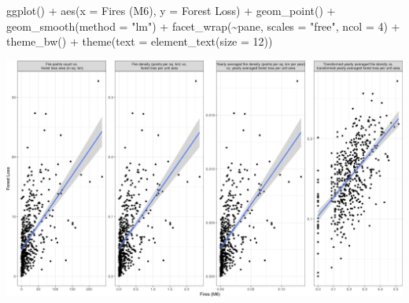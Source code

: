 \documentclass[10pt,landscape,a3paper]{article}
\newenvironment{Shaded}{\begin{snugshade}}{\end{snugshade}}
\newcommand{\AttributeTok}[1]{\textcolor[rgb]{0.77,0.63,0.00}{#1}}
\newcommand{\DecValTok}[1]{\textcolor[rgb]{0.00,0.00,0.81}{#1}}
\newcommand{\FunctionTok}[1]{\textcolor[rgb]{0.00,0.00,0.00}{#1}}
\newcommand{\NormalTok}[1]{#1}
\newcommand{\SpecialCharTok}[1]{\textcolor[rgb]{0.00,0.00,0.00}{#1}}
\newcommand{\StringTok}[1]{\textcolor[rgb]{0.31,0.60,0.02}{#1}}
\begin{document}
\begin{Shaded}
\begin{Highlighting}[]
    \FunctionTok{ggplot}\NormalTok{() }\SpecialCharTok{+} \FunctionTok{aes}\NormalTok{(}\AttributeTok{x =} \StringTok{\textasciigrave{}}\AttributeTok{Fires (M6)}\StringTok{\textasciigrave{}}\NormalTok{, }\AttributeTok{y =} \StringTok{\textasciigrave{}}\AttributeTok{Forest Loss}\StringTok{\textasciigrave{}}\NormalTok{) }\SpecialCharTok{+} \FunctionTok{geom\_point}\NormalTok{() }\SpecialCharTok{+} \FunctionTok{geom\_smooth}\NormalTok{(}\AttributeTok{method =} \StringTok{"lm"}\NormalTok{) }\SpecialCharTok{+}
    \FunctionTok{facet\_wrap}\NormalTok{(}\SpecialCharTok{\textasciitilde{}}\NormalTok{pane, }\AttributeTok{scales =} \StringTok{"free"}\NormalTok{, }\AttributeTok{ncol =} \DecValTok{4}\NormalTok{) }\SpecialCharTok{+} \FunctionTok{theme\_bw}\NormalTok{() }\SpecialCharTok{+} \FunctionTok{theme}\NormalTok{(}\AttributeTok{text =} \FunctionTok{element\_text}\NormalTok{(}\AttributeTok{size =} \DecValTok{12}\NormalTok{))}
\end{Highlighting}
\end{Shaded}

\begin{center}\includegraphics{img/modelling/lta-esda-16} \end{center}
\end{document}
